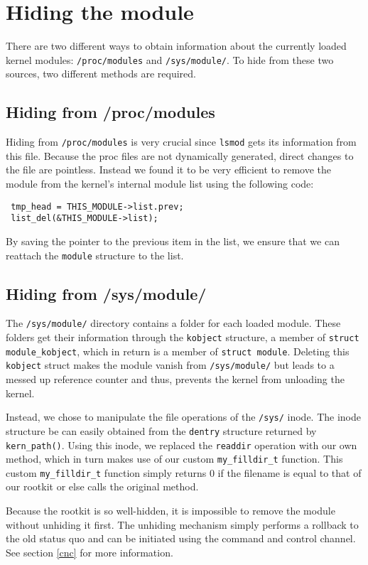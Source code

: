 \section{Hiding the module}
There are two different ways to obtain information about the currently loaded 
kernel modules: \texttt{/proc/modules} and \texttt{/sys/module/}. To hide from 
these two sources, two different methods are required.
\subsection{Hiding from /proc/modules}
Hiding from \texttt{/proc/modules} is very crucial since \texttt{lsmod} gets 
its information from this file. Because the proc files are not dynamically 
generated, direct changes to the file are pointless. Instead we found it to be 
very efficient to remove the module from the kernel's internal module list 
using the following code:
\begin{lstlisting}
 tmp_head = THIS_MODULE->list.prev;
 list_del(&THIS_MODULE->list);	
\end{lstlisting}
By saving the pointer to the previous item in the list, we ensure that we can 
reattach the \texttt{module} structure to the list.

\subsection{Hiding from /sys/module/}
The \texttt{/sys/module/} directory contains a folder for each loaded module. 
These folders get their information through the \texttt{kobject} structure, a 
member of \texttt{struct module\_kobject}, which in return is a member of 
\texttt{struct module}. Deleting this \texttt{kobject} struct makes the module 
vanish from \texttt{/sys/module/} but leads to a messed up reference counter 
and thus, prevents the kernel from unloading the kernel.\par
Instead, we chose to manipulate the file operations of the \texttt{/sys/} 
inode. The inode structure be can easily obtained from the \texttt{dentry} 
structure returned by \texttt{kern\_path()}. Using this inode, we 
replaced the \texttt{readdir} operation with our own method, which in turn 
makes use of 
our custom \texttt{my\_filldir\_t} function. This custom 
\texttt{my\_filldir\_t} function simply returns 0 if 
the filename is equal to that of our rootkit or else calls the original 
method.\newline

Because the rootkit is so well-hidden, it is impossible to remove the module 
without unhiding it first. The unhiding mechanism simply performs a rollback to 
the old status quo and can be initiated using the command and control channel. 
See section \ref{cnc} for more information.